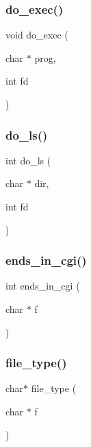 \subsubsection{\texorpdfstring{do\_exec()}{do\_exec()}}
{\footnotesize\ttfamily void do\+\_\+exec (\begin{DoxyParamCaption}\item[{char $\ast$}]{prog,  }\item[{int}]{fd }\end{DoxyParamCaption})}

\mbox{\label{10c-serwer_8c_a83999b0603c38aa5fe08f7ed801e6cfe}} 
\subsubsection{\texorpdfstring{do\_ls()}{do\_ls()}}
{\footnotesize\ttfamily int do\+\_\+ls (\begin{DoxyParamCaption}\item[{char $\ast$}]{dir,  }\item[{int}]{fd }\end{DoxyParamCaption})}

\mbox{\label{10c-serwer_8c_ad3ef3c593d3a792b02a341450eaa62dd}} 
\subsubsection{\texorpdfstring{ends\_in\_cgi()}{ends\_in\_cgi()}}
{\footnotesize\ttfamily int ends\+\_\+in\+\_\+cgi (\begin{DoxyParamCaption}\item[{char $\ast$}]{f }\end{DoxyParamCaption})}

\mbox{\label{10c-serwer_8c_a29b9ee72561809560e62a9ea307d1ff6}} 
\subsubsection{\texorpdfstring{file\_type()}{file\_type()}}
{\footnotesize\ttfamily char$\ast$ file\+\_\+type (\begin{DoxyParamCaption}\item[{char $\ast$}]{f }\end{DoxyParamCaption})}

